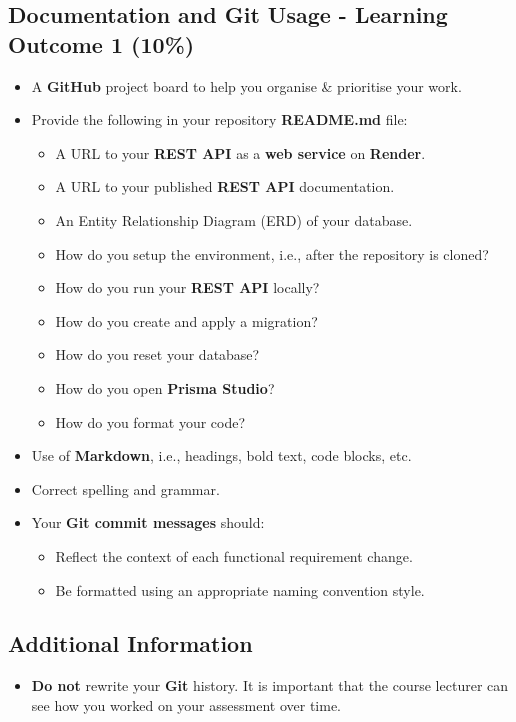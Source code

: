 \documentclass{article}
\begin{document}
\subsection*{Documentation and Git Usage - Learning Outcome 1 (10\%)}
\begin{itemize}
	\item A \textbf{GitHub} project board to help you organise \& prioritise your work. 
    \item Provide the following in your repository \textbf{README.md} file:
    \begin{itemize} 
		\item A URL to your \textbf{REST API} as a \textbf{web service} on \textbf{Render}.
		\item A URL to your published \textbf{REST API} documentation. 
		\item An Entity Relationship Diagram (ERD) of your database.
      \item How do you setup the environment, i.e., after the repository is cloned?
	  \item How do you run your \textbf{REST API} locally?
	  \item How do you create and apply a migration?  
	  \item How do you reset your database?
	  \item How do you open \textbf{Prisma Studio}?
	  \item How do you format your code?
    \end{itemize}
    \item Use of \textbf{Markdown}, i.e., headings, bold text, code blocks, etc.
    \item Correct spelling and grammar.
    \item Your \textbf{Git commit messages} should:
    \begin{itemize}
      \item Reflect the context of each functional requirement change.
      \item Be formatted using an appropriate naming convention style.
    \end{itemize}	
\end{itemize}

\subsection*{Additional Information}
\begin{itemize}
    \item \textbf{Do not} rewrite your \textbf{Git} history. It is important that the course lecturer can see how you worked on your assessment over time. 
\end{itemize} 
\end{document}
